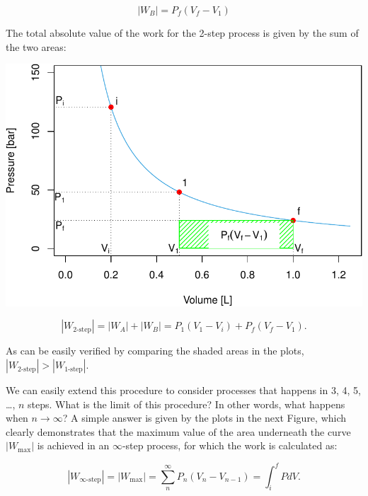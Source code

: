 \documentclass[
]{book}
\theoremstyle{definition}
\theoremstyle{definition}
\theoremstyle{definition}
\theoremstyle{remark}
\begin{document}
\begin{equation}
\left| W_B \right| = P_f (V_f-V_1)
  \label{eq:Warea3}
\end{equation}

The total absolute value of the work for the 2-step process is given by the sum of the two areas:

\begin{center}\includegraphics{Pchem1_files/figure-latex/unnamed-chunk-5-1} \end{center}

\begin{equation}
  \left| W_{\text{2-step}} \right| = \left| W_A \right| + \left| W_B \right| = P_1 (V_1-V_i)+P_f (V_f-V_1).
  \label{eq:Warea4}
\end{equation}

As can be easily verified by comparing the shaded areas in the plots, \(\left| W_{\text{2-step}} \right| > \left| W_{\text{1-step}} \right|\).

We can easily extend this procedure to consider processes that happens in 3, 4, 5, \ldots, \(n\) steps. What is the limit of this procedure? In other words, what happens when \(n \rightarrow \infty\)? A simple answer is given by the plots in the next Figure, which clearly demonstrates that the maximum value of the area underneath the curve \(\left| W_{\text{max}}\right|\) is achieved in an \(\infty\)-step process, for which the work is calculated as:

\begin{equation}
  \left| W_{\infty \text{-step}} \right| = \left| W_{\text{max}} \right| = \sum_{n}^{\infty} P_n(V_n-V_{n-1}) = \int_{i}^{f} PdV.
  \label{eq:WintsolvedV2}
\end{equation}
\end{document}
